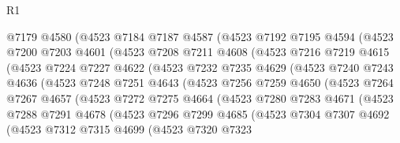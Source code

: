 \begin{lexlean}{R1}
\begin{coremodule}
            @7179
            @4580
            (@4523
              @7184
              @7187
              @4587
              (@4523
                @7192
                @7195
                @4594
                (@4523
                  @7200
                  @7203
                  @4601
                  (@4523
                    @7208
                    @7211
                    @4608
                    (@4523
                      @7216
                      @7219
                      @4615
                      (@4523
                        @7224
                        @7227
                        @4622
                        (@4523
                          @7232
                          @7235
                          @4629
                          (@4523
                            @7240
                            @7243
                            @4636
                            (@4523
                              @7248
                              @7251
                              @4643
                              (@4523
                                @7256
                                @7259
                                @4650
                                (@4523
                                  @7264
                                  @7267
                                  @4657
                                  (@4523
                                    @7272
                                    @7275
                                    @4664
                                    (@4523
                                      @7280
                                      @7283
                                      @4671
                                      (@4523
                                        @7288
                                        @7291
                                        @4678
                                        (@4523
                                          @7296
                                          @7299
                                          @4685
                                          (@4523
                                            @7304
                                            @7307
                                            @4692
                                            (@4523
                                              @7312
                                              @7315
                                              @4699
                                              (@4523
                                                @7320
                                                @7323

\end{coremodule}
\end{lexlean}
